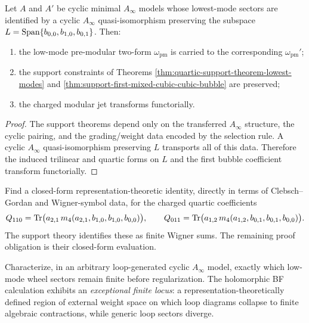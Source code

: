 \begin{proposition}
\label{prop:functoriality-lowest-modes}
Let $A$ and $A'$ be cyclic minimal $A_\infty$ models whose lowest-mode sectors are identified
by a cyclic $A_\infty$ quasi-isomorphism preserving the subspace
$L=\operatorname{Span}\{b_{0,0},b_{1,0},b_{0,1}\}$. Then:
\begin{enumerate}[label=\textup{(\roman*)}]
\item the low-mode pre-modular two-form $\omega_{\mathrm{pm}}$ is carried to the corresponding
$\omega_{\mathrm{pm}}'$;
\item the support constraints of Theorems
\ref{thm:quartic-support-theorem-lowest-modes} and
\ref{thm:support-first-mixed-cubic-cubic-bubble} are preserved;
\item the charged modular jet transforms functorially.
\end{enumerate}
\end{proposition}

\begin{proof}
The support theorems depend only on the transferred $A_\infty$ structure, the cyclic pairing,
and the grading/weight data encoded by the selection rule. A cyclic
$A_\infty$ quasi-isomorphism preserving $L$ transports all of this data. Therefore the induced
trilinear and quartic forms on $L$ and the first bubble coefficient transform functorially.
\end{proof}

\begin{problem}
\label{prob:quartic-wigner-identity}
Find a closed-form representation-theoretic identity, directly in terms of Clebsch--Gordan and
Wigner-symbol data, for the charged quartic coefficients
\[
Q_{110}=\operatorname{Tr}\bigl(a_{2,1}\,m_4(a_{2,1},b_{1,0},b_{1,0},b_{0,0})\bigr),
\qquad
Q_{011}=\operatorname{Tr}\bigl(a_{1,2}\,m_4(a_{1,2},b_{0,1},b_{0,1},b_{0,0})\bigr).
\]
The support theory identifies these as finite Wigner sums. The remaining proof obligation is
their closed-form evaluation.
\end{problem}

\begin{problem}
\label{prob:finite-locus-loop-generated}
Characterize, in an arbitrary loop-generated cyclic $A_\infty$ model, exactly which low-mode
wheel sectors remain finite before regularization. The holomorphic BF calculation exhibits an \emph{exceptional finite locus}: a representation-theoretically defined region of
external weight space on which loop diagrams collapse to finite algebraic contractions, while generic loop sectors diverge.
\end{problem}

